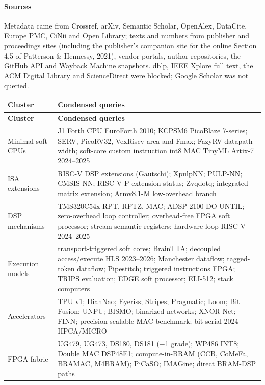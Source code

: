 \paragraph{Sources} Metadata came from Crossref, arXiv, Semantic Scholar, OpenAlex, DataCite, Europe PMC, CiNii and Open Library; texts and numbers from publisher and proceedings sites (including the publisher's companion site for the online Section 4.5 of Patterson \& Hennessy, 2021), vendor portals, author repositories, the GitHub API and Wayback Machine snapshots. dblp, IEEE Xplore full text, the ACM Digital Library and ScienceDirect were blocked; Google Scholar was not queried.

{\small\setlength{\tabcolsep}{4pt}
\begin{xltabular}{\linewidth}{@{}>{\raggedright\arraybackslash{}\hsize}X>{\raggedright\arraybackslash{}\hsize}X@{}}
\toprule \textsf{\bfseries Cluster} & \textsf{\bfseries Condensed queries} \\ \midrule\endfirsthead
\toprule \textsf{\bfseries Cluster} & \textsf{\bfseries Condensed queries} \\ \midrule\endhead
\bottomrule\endlastfoot
Minimal soft CPUs & J1 Forth CPU EuroForth 2010; KCPSM6 PicoBlaze 7-series; SERV, PicoRV32, VexRiscv area and Fmax; FazyRV datapath width; soft-core custom instruction int8 MAC TinyML Artix-7 2024–2025 \\*
ISA extensions & RISC-V DSP extensions (Gautschi); XpulpNN; PULP-NN; CMSIS-NN; RISC-V P extension status; Zvqdotq; integrated matrix extension; Armv8.1-M low-overhead branch \\
DSP mechanisms & TMS320C54x RPT, RPTZ, MAC; ADSP-2100 DO UNTIL; zero-overhead loop controller; overhead-free FPGA soft processor; stream semantic registers; hardware loop RISC-V 2024–2025 \\
Execution models & transport-triggered soft cores; BrainTTA; decoupled access/execute HLS 2023–2026; Manchester dataflow; tagged-token dataflow; Pipestitch; triggered instructions FPGA; TRIPS evaluation; EDGE soft processor; ELI-512; stack computers \\
Accelerators & TPU v1; DianNao; Eyeriss; Stripes; Pragmatic; Loom; Bit Fusion; UNPU; BISMO; binarized networks; XNOR-Net; FINN; precision-scalable MAC benchmark; bit-serial 2024 HPCA/MICRO \\
FPGA fabric & UG479, UG473, DS180, DS181 (−1 grade); WP486 INT8; Double MAC DSP48E1; compute-in-BRAM (CCB, CoMeFa, BRAMAC, M4BRAM); PiCaSO; IMAGine; direct BRAM-DSP paths \\

\end{xltabular}}
